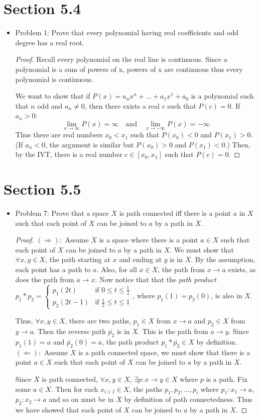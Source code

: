 \documentclass[hidelinks,12pt]{article}
\theoremstyle{definition}
\renewcommand{\skip}{\par\null\par}
\begin{document}
\section{Section 5.4}
\begin{itemize}
    \item Problem 1: Prove that every polynomial having real coefficients and odd degree has a real root.\begin{proof}
    Recall every polynomial on the real line is continuous. Since a polynomial is a sum of powers of x, powers of x are continuous thus every polynomial is continuous.\skip We want to show that if $P(x)=a_nx^n+\dots+a_1x^1+a_0$ is a polynomial such that $n$ odd and $a_n\neq0$, then there exists a real $c$ such that $P(c)=0$. If $a_n>0$: $$\lim_{x\to\infty}P(x)=\infty\quad\text{and}\quad\lim_{x\to-\infty}P(x)=-\infty$$ Thus there are real numbers $x_0<x_1$ such that $P(x_0)<0$ and $P(x_1)>0$. (If $a_n<0$, the argument is similar but $P(x_0)>0$ and $P(x_1)<0$.) Then, by the IVT, there is a real number $c\in[x_0,x_1]$ such that $P(c)=0$.
    \end{proof}
\end{itemize}
\section{Section 5.5}
\begin{itemize}
    \item Problem 7: Prove that a space $X$ is path connected iff there is a point $a$ in $X$ such that each point of $X$ can be joined to $a$ by a path in $X$.\begin{proof}
$(\Longrightarrow):$ Assume $X$ is a space where there is a point $a\in X$ such that each point of $X$ can be joined to $a$ by a path in $X$. We must show that $\forall x,y\in X$, the path starting at $x$ and ending at $y$ is in $X$. By the assumption, each point has a path to $a$. Also, for all $x\in X$, the path from $x\to a$ exists, as does the path from $a\to x$. Now notice that that the \emph{path product} $p_1*p_2=\begin{cases} p_1(2t) &\mbox{if } 0\leq t\leq\frac{1}{2} \\
p_2(2t-1) & \mbox{if } \frac{1}{2}\leq t\leq1\end{cases}$, where $p_1(1)=p_2(0)$, is also in $X$.\skip Thus, $\forall x,y\in X$, there are two paths, $p_1\in X$ from $x\to a$ and $p_2\in X$ from $y\to a$. Then the reverse path $\bar{p_2}$ is in $X$. This is the path from $a\to y$. Since $p_1(1)=a$ and $\bar{p_2}(0)=a$, the path product $p_1*\bar{p_2}\in X$ by definition.\newline $(\Longleftarrow):$ Assume $X$ is a path connected space, we must show that there is a point $a\in X$ such that each point of $X$ can be joined to $a$ by a path in $X$.\skip Since $X$ is path connected, $\forall x,y\in X$, $\exists p:x\to y\in X$ where $p$ is a path. Fix some $a\in X$. Then for each $x_{i\in I}\in X$, the paths $p_1,p_2,\dots,p_i$ where $p_1:x_1\to a$, $p_2:x_2\to a$ and so on must be in $X$ by definition of path connectedness. Thus we have showed that each point of $X$ can be joined to $a$ by a path in $X$.
    \end{proof}
\end{itemize}
\end{document}
